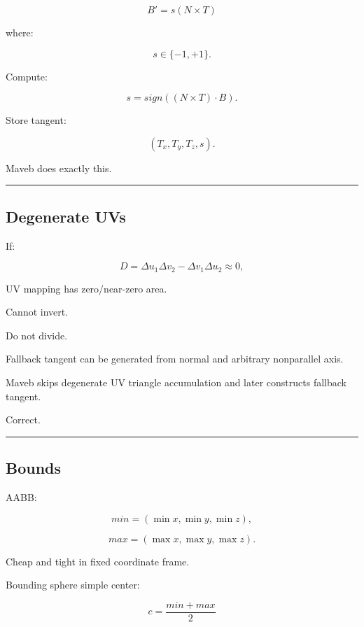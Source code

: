 \[
B'
=
s(N\times T)
\]

where:

\[
s\in\{-1,+1\}.
\]

Compute:

\[
\boxed{
s=
sign(
(N\times T)\cdot B
).
}
\]

Store tangent:

\[
(T_x,T_y,T_z,s).
\]

Maveb does exactly this.

\begin{center}\rule{0.5\linewidth}{0.5pt}\end{center}

\subsection{Degenerate UVs}\label{04-visual-computing-ii-ch041-degenerate-uvs}

\hypertarget{04-visual-computing-ii-ch041-degenerate-uvs}{}

If:

\[
D
=
\Delta u_1\Delta v_2-
\Delta v_1\Delta u_2
\approx0,
\]

UV mapping has zero/near-zero area.

Cannot invert.

Do not divide.

Fallback tangent can be generated from normal and arbitrary nonparallel axis.

Maveb skips degenerate UV triangle accumulation and later constructs fallback tangent.

Correct.

\begin{center}\rule{0.5\linewidth}{0.5pt}\end{center}

\subsection{Bounds}\label{04-visual-computing-ii-ch041-bounds}

\hypertarget{04-visual-computing-ii-ch041-bounds}{}

AABB:

\[
min=
(\min x,\min y,\min z),
\]

\[
max=
(\max x,\max y,\max z).
\]

Cheap and tight in fixed coordinate frame.

Bounding sphere simple center:

\[
c=
\frac{min+max}{2}
\]

